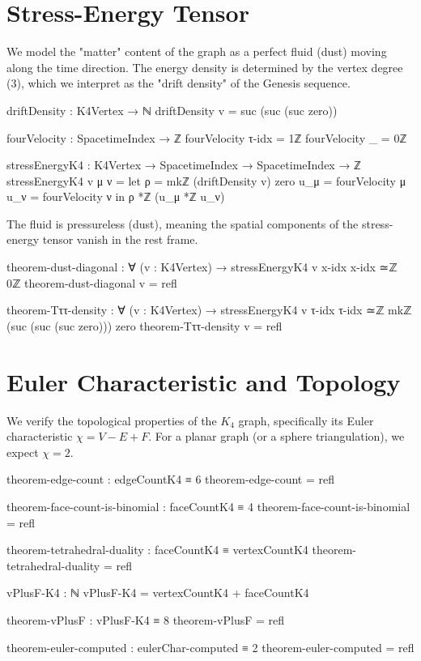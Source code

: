 \documentclass[11pt,a4paper]{book}
\begin{document}
\section{Stress-Energy Tensor}

We model the "matter" content of the graph as a perfect fluid (dust) moving along the time direction. The energy density is determined by the vertex degree (3), which we interpret as the "drift density" of the Genesis sequence.

\begin{code}
driftDensity : K4Vertex → ℕ
driftDensity v = suc (suc (suc zero))

fourVelocity : SpacetimeIndex → ℤ
fourVelocity τ-idx = 1ℤ
fourVelocity _     = 0ℤ

stressEnergyK4 : K4Vertex → SpacetimeIndex → SpacetimeIndex → ℤ
stressEnergyK4 v μ ν = 
  let ρ   = mkℤ (driftDensity v) zero
      u_μ = fourVelocity μ
      u_ν = fourVelocity ν
  in ρ *ℤ (u_μ *ℤ u_ν)
\end{code}

The fluid is pressureless (dust), meaning the spatial components of the stress-energy tensor vanish in the rest frame.

\begin{code}
theorem-dust-diagonal : ∀ (v : K4Vertex) → stressEnergyK4 v x-idx x-idx ≃ℤ 0ℤ
theorem-dust-diagonal v = refl

theorem-Tττ-density : ∀ (v : K4Vertex) → 
  stressEnergyK4 v τ-idx τ-idx ≃ℤ mkℤ (suc (suc (suc zero))) zero
theorem-Tττ-density v = refl
\end{code}


\section{Euler Characteristic and Topology}

We verify the topological properties of the $K_4$ graph, specifically its Euler characteristic $\chi = V - E + F$. For a planar graph (or a sphere triangulation), we expect $\chi = 2$.

\begin{code}
theorem-edge-count : edgeCountK4 ≡ 6
theorem-edge-count = refl

theorem-face-count-is-binomial : faceCountK4 ≡ 4
theorem-face-count-is-binomial = refl

theorem-tetrahedral-duality : faceCountK4 ≡ vertexCountK4
theorem-tetrahedral-duality = refl

vPlusF-K4 : ℕ
vPlusF-K4 = vertexCountK4 + faceCountK4

theorem-vPlusF : vPlusF-K4 ≡ 8
theorem-vPlusF = refl

theorem-euler-computed : eulerChar-computed ≡ 2
theorem-euler-computed = refl
\end{code}
\end{document}
